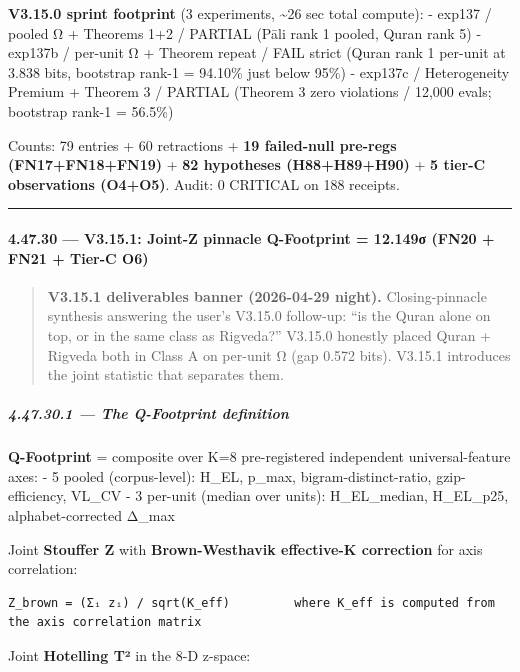 \documentclass[
]{article}
\begin{document}
\textbf{V3.15.0 sprint footprint} (3 experiments, \textasciitilde26 sec
total compute): - exp137 / pooled Ω + Theorems 1+2 / PARTIAL (Pāli rank
1 pooled, Quran rank 5) - exp137b / per-unit Ω + Theorem repeat / FAIL
strict (Quran rank 1 per-unit at 3.838 bits, bootstrap rank-1 = 94.10\%
just below 95\%) - exp137c / Heterogeneity Premium + Theorem 3 / PARTIAL
(Theorem 3 zero violations / 12,000 evals; bootstrap rank-1 = 56.5\%)

Counts: 79 entries + 60 retractions + \textbf{19 failed-null pre-regs
(FN17+FN18+FN19)} + \textbf{82 hypotheses (H88+H89+H90)} + \textbf{5
tier-C observations (O4+O5)}. Audit: 0 CRITICAL on 188 receipts.

\begin{center}\rule{0.5\linewidth}{0.5pt}\end{center}

\paragraph{4.47.30 --- V3.15.1: Joint-Z pinnacle Q-Footprint = 12.149σ
(FN20 + FN21 + Tier-C
O6)}\label{v3.15.1-joint-z-pinnacle-q-footprint-12.149ux3c3-fn20-fn21-tier-c-o6}

\begin{quote}
\textbf{V3.15.1 deliverables banner (2026-04-29 night).}
Closing-pinnacle synthesis answering the user's V3.15.0 follow-up: ``is
the Quran alone on top, or in the same class as Rigveda?'' V3.15.0
honestly placed Quran + Rigveda both in Class A on per-unit Ω (gap 0.572
bits). V3.15.1 introduces the joint statistic that separates them.
\end{quote}

\subparagraph{4.47.30.1 --- The Q-Footprint
definition}\label{the-q-footprint-definition}

\textbf{Q-Footprint} = composite over K=8 pre-registered independent
universal-feature axes: - 5 pooled (corpus-level): H\_EL, p\_max,
bigram-distinct-ratio, gzip-efficiency, VL\_CV - 3 per-unit (median over
units): H\_EL\_median, H\_EL\_p25, alphabet-corrected Δ\_max

Joint \textbf{Stouffer Z} with \textbf{Brown-Westhavik effective-K
correction} for axis correlation:

\begin{verbatim}
Z_brown = (Σᵢ zᵢ) / sqrt(K_eff)         where K_eff is computed from the axis correlation matrix
\end{verbatim}

Joint \textbf{Hotelling T²} in the 8-D z-space:
\end{document}
